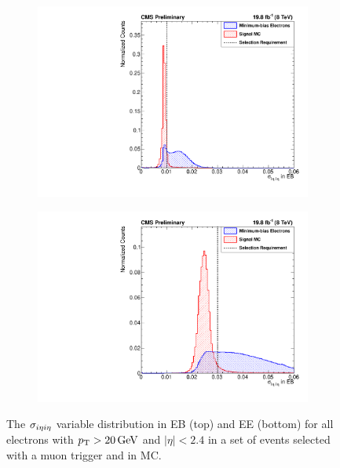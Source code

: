 \begin{figure}[!htbp]
    \centering
    \begin{subfigure}[b]{\StackedPlotWidth}
        \includegraphics[width=\textwidth]{figures/e_reco_var_sigma_ieta_ieta_eb.pdf}
        \caption{}
        \label{fig:sieie_eb}
    \end{subfigure}
    \begin{subfigure}[b]{\StackedPlotWidth}
        \includegraphics[width=\textwidth]{figures/e_reco_var_sigma_ieta_ieta_ee.pdf}
        \caption{}
        \label{fig:sieie_ee}
    \end{subfigure}
    \caption[
        Distributions of $\sigmaietaieta$ in EB and EE in data and MC.
    ]{
        The $\sigmaietaieta$ variable distribution in EB (top) and EE (bottom)
        for all electrons with $p_{\mathrm{T}} > 20 \,\text{Ge\hspace{-.08em}V}$ and $|\eta| < 2.4$ in a set of
        events selected with a muon trigger and in \MADGRAPH \Ztoee MC.
    }
    \label{fig:sieie}
\end{figure}

